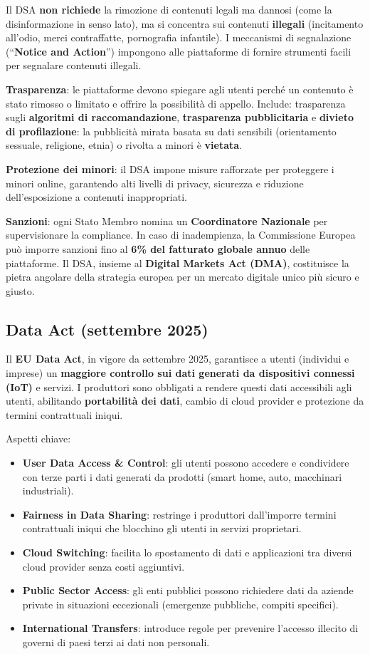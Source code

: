 \documentclass[a4paper,11pt]{article}
\begin{document}
Il DSA \textbf{non richiede} la rimozione di contenuti legali ma dannosi (come la disinformazione in senso lato), ma si concentra sui contenuti \textbf{illegali} (incitamento all'odio, merci contraffatte, pornografia infantile). I meccanismi di segnalazione (``\textbf{Notice and Action}'') impongono alle piattaforme di fornire strumenti facili per segnalare contenuti illegali.

\textbf{Trasparenza}: le piattaforme devono spiegare agli utenti perch\'{e} un contenuto \`{e} stato rimosso o limitato e offrire la possibilit\`{a} di appello. Include: trasparenza sugli \textbf{algoritmi di raccomandazione}, \textbf{trasparenza pubblicitaria} e \textbf{divieto di profilazione}: la pubblicit\`{a} mirata basata su dati sensibili (orientamento sessuale, religione, etnia) o rivolta a minori \`{e} \textbf{vietata}.

\textbf{Protezione dei minori}: il DSA impone misure rafforzate per proteggere i minori online, garantendo alti livelli di privacy, sicurezza e riduzione dell'esposizione a contenuti inappropriati.

\textbf{Sanzioni}: ogni Stato Membro nomina un \textbf{Coordinatore Nazionale} per supervisionare la compliance. In caso di inadempienza, la Commissione Europea pu\`{o} imporre sanzioni fino al \textbf{6\% del fatturato globale annuo} delle piattaforme. Il DSA, insieme al \textbf{Digital Markets Act (DMA)}, costituisce la pietra angolare della strategia europea per un mercato digitale unico pi\`{u} sicuro e giusto.

\subsection{Data Act (settembre 2025)}

Il \textbf{EU Data Act}, in vigore da settembre 2025, garantisce a utenti (individui e imprese) un \textbf{maggiore controllo sui dati generati da dispositivi connessi (IoT)} e servizi. I produttori sono obbligati a rendere questi dati accessibili agli utenti, abilitando \textbf{portabilit\`{a} dei dati}, cambio di cloud provider e protezione da termini contrattuali iniqui.

Aspetti chiave:
\begin{itemize}
  \item \textbf{User Data Access \& Control}: gli utenti possono accedere e condividere con terze parti i dati generati da prodotti (smart home, auto, macchinari industriali).
  \item \textbf{Fairness in Data Sharing}: restringe i produttori dall'imporre termini contrattuali iniqui che blocchino gli utenti in servizi proprietari.
  \item \textbf{Cloud Switching}: facilita lo spostamento di dati e applicazioni tra diversi cloud provider senza costi aggiuntivi.
  \item \textbf{Public Sector Access}: gli enti pubblici possono richiedere dati da aziende private in situazioni eccezionali (emergenze pubbliche, compiti specifici).
  \item \textbf{International Transfers}: introduce regole per prevenire l'accesso illecito di governi di paesi terzi ai dati non personali.
\end{itemize}
\end{document}

